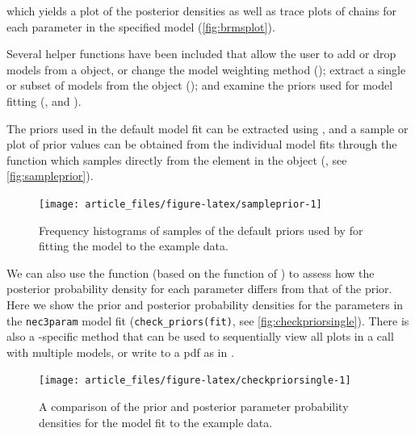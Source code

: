 \documentclass[
  shortnames]{jss}
\begin{document}
which yields a plot of the posterior densities as well as trace plots of chains for each parameter in the specified model (\autoref{fig:brmsplot}).

Several helper functions have been included that allow the user to add or drop models from a  object, or change the model weighting method (); extract a single or subset of models from the  object (); and examine the priors used for model fitting (,  and ).

The priors used in the default model fit can be extracted using , and a sample or plot of prior values can be obtained from the individual  model fits through the function  which samples directly from the  element in the  object (, see \autoref{fig:sampleprior}).

\begin{CodeChunk}
\begin{figure}[!ht]

{\centering \texttt{[image: article\_files/figure-latex/sampleprior-1]} 

}

\caption[Frequency histograms of samples of the default priors used by  for fitting the  model to the example data]{Frequency histograms of samples of the default priors used by  for fitting the  model to the example data.}\label{fig:sampleprior}
\end{figure}
\end{CodeChunk}

We can also use the function  (based on the  function of ) to assess how the posterior probability density for each parameter differs from that of the prior. Here we show the prior and posterior probability densities for the parameters in the \texttt{nec3param} model fit (\texttt{check\_priors(fit)}, see \autoref{fig:checkpriorsingle}). There is also a -specific method that can be used to sequentially view all plots in a  call with multiple models, or write to a pdf as in .

\begin{CodeChunk}
\begin{figure}[!ht]

{\centering \texttt{[image: article\_files/figure-latex/checkpriorsingle-1]} 

}

\caption[A comparison of the prior and posterior parameter probability densities for the  model fit to the example data]{A comparison of the prior and posterior parameter probability densities for the  model fit to the example data.}\label{fig:checkpriorsingle}
\end{figure}
\end{CodeChunk}
\end{document}
